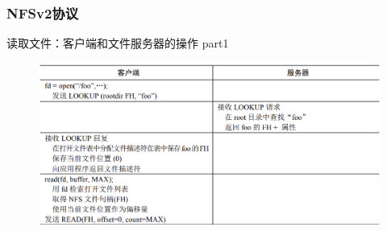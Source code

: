 \begin{frame}[fragile]
    \frametitle{NFSv2协议}
    读取文件：客户端和文件服务器的操作 part1
    \begin{figure}
        \includegraphics[width=0.8\linewidth]{figs/nfsv2-read-1.png}
    \end{figure}
    
\end{frame}


